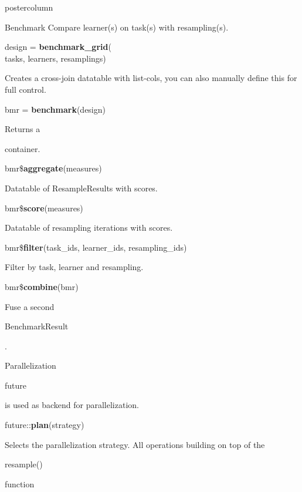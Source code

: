 \documentclass{beamer}
\newlength{\columnheight} %
\newcommand{\codeinline}[1]{\begin{codeboxinline}#1\end{codeboxinline}}
\begin{document}
\begin{withoutheader}
\begin{frame}[fragile]{}
\begin{columns}
\begin{column}{.245\textwidth}
\begin{beamercolorbox}[center]{postercolumn}
\begin{minipage}{.98\textwidth}
					\parbox[t][\columnheight]{\textwidth}{
						\begin{myblock}{Benchmark}
                            Compare learner(s) on task(s) with resampling(s).
							\\
							\begin{codeboxmultiline}[width=19.4cm]
								design = \textbf{benchmark\_grid}(\\
								\hspace*{1ex}tasks, learners, resamplings)
							\end{codeboxmultiline}
							Creates a cross-join datatable with list-cols, you can also manually define this for full control.
							\\
							\begin{codebox}
								bmr = \textbf{benchmark}(design)
							\end{codebox}
							Returns a \codeinline{}
							container.
							\\
							\begin{codebox}
								bmr\$\textbf{aggregate}(measures)
							\end{codebox}
							Datatable of ResampleResults with scores.
							\\
							\begin{codebox}
								bmr\$\textbf{score}(measures)
							\end{codebox}
							Datatable of resampling iterations with scores. 
							\\
							\begin{codeboxmultiline}[width=26cm]
								{\footnotesize bmr\$\textbf{filter}(task\_ids, learner\_ids, resampling\_ids)}
							\end{codeboxmultiline}
							Filter by task, learner and resampling. 
							\\
							\begin{codebox}
								bmr\$\textbf{combine}(bmr)
							\end{codebox}
							Fuse a second \codeinline{BenchmarkResult}. 
						\end{myblock}
						\begin{myblock}{Parallelization}
							\codeinline{future} is used as backend for parallelization.
							\\
							\begin{codebox}
								future::\textbf{plan}(strategy)
							\end{codebox}
							Selects the parallelization strategy. 
							All operations building on top of the \codeinline{resample()} function 

\end{myblock}}
\end{minipage}
\end{beamercolorbox}
\end{column}
\end{columns}
\end{frame}
\end{withoutheader}
\end{document}
